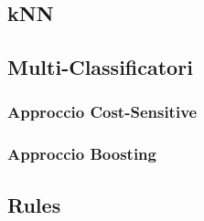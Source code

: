 \subsection{kNN}

\subsection{Multi-Classificatori}

\subsubsection{Approccio Cost-Sensitive}

\subsubsection{Approccio Boosting}

\subsection{Rules}
